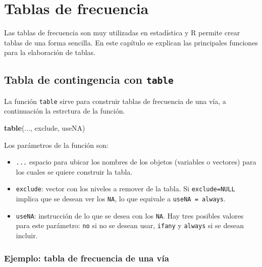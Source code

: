 \documentclass[10pt,]{krantz}
\makeatletter
\newenvironment{Shaded}{\begin{snugshade}}{\end{snugshade}}
\newcommand{\KeywordTok}[1]{\textcolor[rgb]{0.13,0.29,0.53}{\textbf{#1}}}
\newcommand{\NormalTok}[1]{#1}
\providecommand{\tightlist}{%
  \setlength{\itemsep}{0pt}\setlength{\parskip}{0pt}}
\newenvironment{kframe}{%
\medskip{}
\setlength{\fboxsep}{.8em}
 \def\at@end@of@kframe{}%
 \ifinner\ifhmode%
  \def\at@end@of@kframe{\end{minipage}}%
  \begin{minipage}{\columnwidth}%
 \fi\fi%
 \def\FrameCommand##1{\hskip\@totalleftmargin \hskip-\fboxsep
 \colorbox{shadecolor}{##1}\hskip-\fboxsep
     \hskip-\linewidth \hskip-\@totalleftmargin \hskip\columnwidth}%
 \MakeFramed {\advance\hsize-\width
   \@totalleftmargin\z@ \linewidth\hsize
   \@setminipage}}%
 {\par\unskip\endMakeFramed%
 \at@end@of@kframe}
\renewenvironment{Shaded}{\begin{kframe}}{\end{kframe}}
\makeatother
\begin{document}
\chapter{Tablas de frecuencia}\label{tablas}

Las tablas de frecuencia son muy utilizadas en estadística y R permite
crear tablas de una forma sencilla. En este capítulo se explican las
principales funciones para la elaboración de tablas.

\section{\texorpdfstring{Tabla de contingencia con \texttt{table}
}{Tabla de contingencia con table }}\label{tabla-de-contingencia-con-table}

La función \texttt{table} sirve para construir tablas de frecuencia de
una vía, a continuación la estrctura de la función.

\begin{Shaded}
\begin{Highlighting}[]
\KeywordTok{table}\NormalTok{(..., exclude, useNA)}
\end{Highlighting}
\end{Shaded}

Los parámetros de la función son:

\begin{itemize}
\tightlist
\item
  \texttt{...} espacio para ubicar los nombres de los objetos (variables
  o vectores) para los cuales se quiere construir la tabla.
\item
  \texttt{exclude}: vector con los niveles a remover de la tabla. Si
  \texttt{exclude=NULL} implica que se desean ver los \texttt{NA}, lo
  que equivale a
  \texttt{useNA\ =\ \textquotesingle{}always\textquotesingle{}}.
\item
  \texttt{useNA}: instrucción de lo que se desea con los \texttt{NA}.
  Hay tres posibles valores para este parámetro:
  \texttt{\textquotesingle{}no\textquotesingle{}} si no se desean usar,
  \texttt{\textquotesingle{}ifany\textquotesingle{}} y
  \texttt{\textquotesingle{}always\textquotesingle{}} si se desean
  incluir.
\end{itemize}

\subsection*{Ejemplo: tabla de frecuencia de una
vía}\label{ejemplo-tabla-de-frecuencia-de-una-via}
\end{document}
